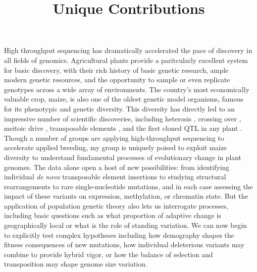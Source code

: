 \documentclass[11pt,letterpaper]{article}
\title{Unique Contributions}
\date{}
\begin{document}
\maketitle

\noindent High throughput sequencing has dramatically accelerated the pace of discovery in all fields of genomics.
Agricultural plants provide a paritcularly excellent system for basic discovery, with their rich history of basic genetic research, ample modern genetic resources, and the opportunity to sample or even replicate genotypes across a wide array of environments.
The country's most economically valuable crop, maize, is also one of the oldest genetic model organisms, famous for its phenotypic and genetic diversity.
This diversity has directly led to an impressive number of scientific discoveries, including heterosis \citep{shull1908composition}, crossing over \citep{creighton1931correlation}, meitoic drive \citep{rhoades1942preferential}, transposable elements \citep{mcclintock1950origin}, and the first cloned QTL in any plant \citep{doebley1997evolution}. 
Though a number of groups are applying high-throughput sequencing to accelerate applied breeding, my group is uniquely poised to  exploit maize diversity to understand fundamental processes of evolutionary change in plant genomes.
The data alone open a host of new possibilities: from identifying individual \emph{de novo} transposable element insertions to studying structural rearrangements to rare single-nucleotide mutations, and in each case assessing the impact of these variants on expression, methylation, or chromatin state.
But the application of population genetic theory also lets us interrogate processes, including basic questions such as what proportion of adaptive change is geographically local or what is the role of standing variation. 
We can now begin to explicitly test complex hypotheses including how demography shapes the fitness consequences of new mutations, how individual deleterious variants may combine to provide hybrid vigor, or how the balance of selection and transposition may shape genome size variation.




\end{document}
